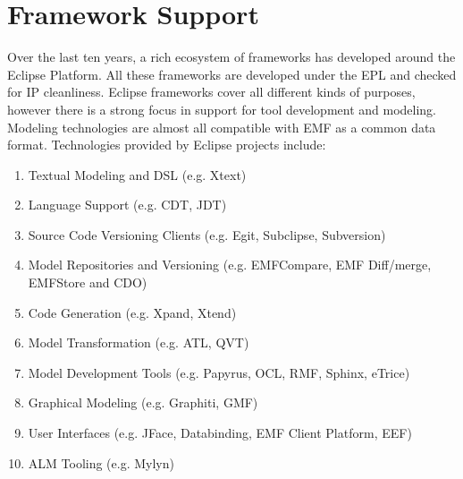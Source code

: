 \section{Framework Support}
Over the last ten years, a rich ecosystem of frameworks has developed around the Eclipse Platform. All these frameworks are developed under the EPL and checked for IP cleanliness. Eclipse frameworks cover all different kinds of purposes, however there is a strong focus in support for tool development and modeling. Modeling technologies are almost all compatible with EMF as a common data format. Technologies provided by Eclipse projects include:
\begin{enumerate}
\item Textual Modeling and DSL (e.g. Xtext)
\item Language Support (e.g. CDT, JDT)
\item Source Code Versioning Clients (e.g. Egit, Subclipse, Subversion)
\item Model Repositories and Versioning (e.g. EMFCompare, EMF Diff/merge, EMFStore and CDO)
\item Code Generation (e.g. Xpand, Xtend)
\item Model Transformation (e.g. ATL, QVT)
\item Model Development Tools (e.g. Papyrus, OCL, RMF, Sphinx, eTrice)
\item Graphical Modeling (e.g. Graphiti, GMF)
\item User Interfaces (e.g. JFace, Databinding, EMF Client Platform, EEF)
\item ALM Tooling (e.g. Mylyn)
\end{enumerate}
